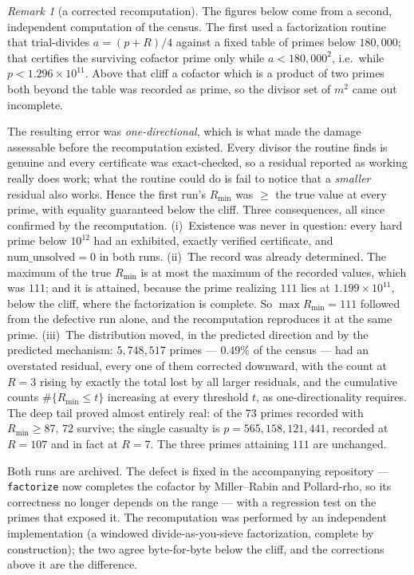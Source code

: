 \documentclass[11pt]{article}
\theoremstyle{plain}
\theoremstyle{remark}
\newtheorem{remark}[theorem]{Remark}
\theoremstyle{plain}
\numberwithin{equation}{section}
\begin{document}
\begin{remark}[a corrected recomputation]\label{rem:erratum}
The figures below come from a second, independent computation of the
census. The first used a factorization routine that trial-divides
$a = (p+R)/4$ against a fixed table of primes below $180{,}000$; that
certifies the surviving cofactor prime only while $a < 180{,}000^2$,
i.e.\ while $p < 1.296 \times 10^{11}$. Above that cliff a cofactor
which is a product of two primes both beyond the table was recorded as
prime, so the divisor set of $m^2$ came out incomplete.

The resulting error was \emph{one-directional}, which is what made the
damage assessable before the recomputation existed. Every divisor the
routine finds is genuine and every certificate was exact-checked, so a
residual reported as working really does work; what the routine could
do is fail to notice that a \emph{smaller} residual also works. Hence
the first run's $R_{\min}$ was $\ge$ the true value at every prime,
with equality guaranteed below the cliff. Three consequences, all
since confirmed by the recomputation.
\textup{(i)}~Existence was never in question: every hard prime below
$10^{12}$ had an exhibited, exactly verified certificate, and
$\mathrm{num\_unsolved} = 0$ in both runs.
\textup{(ii)}~The record was already determined. The maximum of the
true $R_{\min}$ is at most the maximum of the recorded values, which
was $111$; and it is attained, because the prime realizing $111$ lies
at $1.199 \times 10^{11}$, below the cliff, where the factorization is
complete. So $\max R_{\min} = 111$ followed from the defective run
alone, and the recomputation reproduces it at the same prime.
\textup{(iii)}~The distribution moved, in the predicted direction and
by the predicted mechanism: $5{,}748{,}517$ primes --- $0.49\%$ of the
census --- had an overstated residual, every one of them corrected
downward, with the count at $R = 3$ rising by exactly the total lost
by all larger residuals, and the cumulative counts
$\#\{R_{\min} \le t\}$ increasing at every threshold $t$, as
one-directionality requires. The deep tail proved almost entirely
real: of the $73$ primes recorded with $R_{\min} \ge 87$, $72$
survive; the single casualty is $p = 565{,}158{,}121{,}441$, recorded
at $R = 107$ and in fact at $R = 7$. The three primes attaining $111$
are unchanged.

Both runs are archived. The defect is fixed in the accompanying
repository --- \texttt{factorize} now completes the cofactor by
Miller--Rabin and Pollard-rho, so its correctness no longer depends on
the range --- with a regression test on the primes that exposed it.
The recomputation was performed by an independent implementation (a
windowed divide-as-you-sieve factorization, complete by construction);
the two agree byte-for-byte below the cliff, and the corrections above
it are the difference.
\end{remark}
\end{document}
